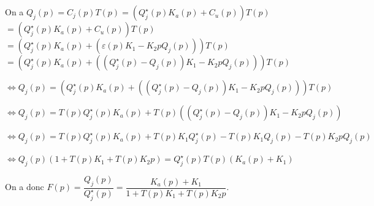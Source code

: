 \documentclass[10pt,fleqn]{article} %
\begin{document}
\subparagraph{}\textit{}%
\subparagraph{}\textit{}%

\subparagraph{}\textit{}%

On a $Q_j(p) = C_j(p) T(p)= \left( Q_j^{\star}(p) K_a(p) + C_u(p) \right) T(p)$
$= \left( Q_j^{\star}(p) K_a(p) + C_u(p) \right) T(p)$
$= \left( Q_j^{\star}(p) K_a(p) + \left( \varepsilon(p) K_1 - K_2 p Q_j(p) \right)\right) T(p)$
$= \left( Q_j^{\star}(p) K_a(p) + \left( \left(Q_j^{\star}(p) - Q_j(p) \right) K_1 - K_2 p Q_j(p) \right)\right) T(p)$


$\Leftrightarrow Q_j(p) = 
\left(
    Q_j^{\star}(p) K_a(p) + 
    \left( 
        \left(Q_j^{\star}(p) - Q_j(p) \right) K_1 - K_2 p Q_j(p) 
    \right)
\right) T(p)$

$\Leftrightarrow Q_j(p) = 
    T(p)Q_j^{\star}(p) K_a(p) + 
    T(p)\left( 
        \left(Q_j^{\star}(p) - Q_j(p) \right) K_1 - K_2 p Q_j(p) 
    \right) $

$\Leftrightarrow Q_j(p) = 
    T(p)Q_j^{\star}(p) K_a(p) + 
        T(p)K_1 Q_j^{\star}(p) -T(p)K_1  Q_j(p)   - T(p)K_2 p Q_j(p) 
     $

$\Leftrightarrow Q_j(p)\left(1     +T(p)K_1     + T(p)K_2 p\right)= 
      Q_j^{\star}(p)T(p) \left(  K_a(p)     +K_1 \right)     $

On a donc $F(p)=\dfrac{Q_j(p)}{Q_j^{\star}(p)}=\dfrac{ K_a(p) +K_1}{1+T(p)K_1 + T(p)K_2 p}$.
\end{document}
